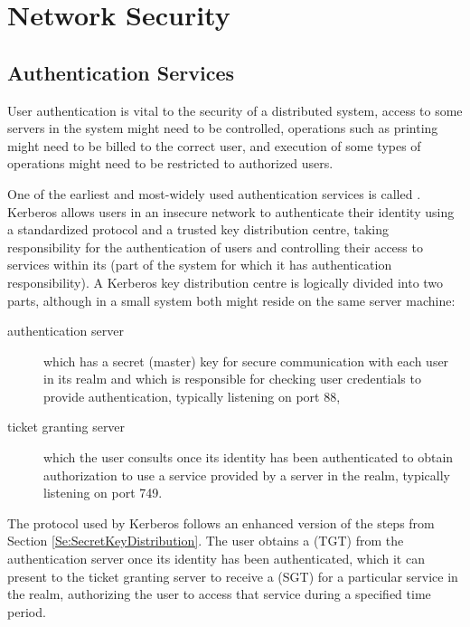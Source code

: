 
\chapter{Network Security}


\section{Authentication Services}\label{Se:AuthenticationServices}


User authentication is vital to the security of a distributed system,
access to some servers in the system might need to be controlled,
operations such as printing might need to be billed to the correct user,
and execution of some types of operations might need to be restricted to authorized users.

One of the earliest and most-widely used authentication services is called
. Kerberos allows users in an insecure network to
authenticate their identity using a standardized protocol and a trusted
key distribution centre, taking responsibility for the authentication of
users and controlling their access to services within its 
(part of the system for which it has authentication responsibility).
A Kerberos key distribution centre is logically divided into two parts,
although in a small system both might reside on the same server machine:
\begin{description}
  \item[authentication server] which has a secret (master) key for secure communication
  with each user in its realm and which is responsible for checking user
  credentials to provide authentication, typically listening on port 88,
  \item[ticket granting server] which the user consults once its identity
  has been authenticated to obtain authorization to use a service
  provided by a server in the realm, typically listening on port 749.
\end{description}
The protocol used by Kerberos follows an enhanced version of the steps
from Section \ref{Se:SecretKeyDistribution}.
The user obtains a  (TGT) from the authentication
server once its identity has been authenticated, which it can present
to the ticket granting server to receive a  (SGT)
for a particular service in the realm, authorizing the user to access that
service during a specified time period.

